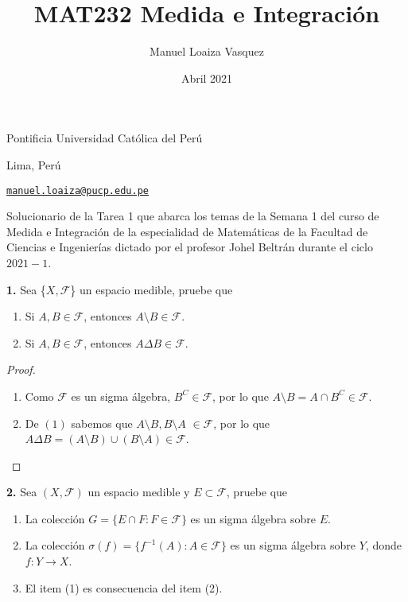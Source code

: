 \documentclass{article}
\title{MAT232 Medida e Integraci\'on}
\author{Manuel Loaiza Vasquez}
\date{Abril 2021}
\newenvironment{statement}[1]{\smallskip\noindent\color[rgb]{1.00,0.00,0.50} {\bf #1.}}{}
\theoremstyle{definition}
\theoremstyle{remark}
\begin{document}
\maketitle

\vspace*{-0.25in}
\centerline{Pontificia Universidad Cat\'olica del Per\'u}
\centerline{Lima, Per\'u}
\centerline{\href{mailto:manuel.loaiza@pucp.edu.pe}{{\tt manuel.loaiza@pucp.edu.pe}}}
\vspace*{0.15in}

\begin{framed}
  Solucionario de la Tarea 1 que abarca los temas de la Semana 1 del curso de Medida e Integraci\'on
  de la especialidad de Matem\'aticas de la Facultad de Ciencias e Ingenier\'ias
  dictado por el profesor Johel Beltr\'an durante el ciclo $2021-1$.
\end{framed}

\begin{statement}{1}
  Sea \{$X, \mathcal{F}$\} un espacio medible, pruebe que
  \begin{enumerate}
    \item Si $A, B \in \mathcal{F}$, entonces $A \setminus B \in \mathcal{F}$.
    \item Si $A, B \in \mathcal{F}$, entonces $A \Delta B \in \mathcal{F}$.
  \end{enumerate}
\end{statement}

\begin{proof}
  \begin{enumerate}
    \item Como $\mathcal{F}$ es un sigma \'algebra, $B^C \in \mathcal{F}$, por lo que $A \setminus B = A \cap B^C \in \mathcal{F}$.
    \item De $(1)$ sabemos que $A \setminus B, B \setminus A$ $\in \mathcal{F}$, por lo que $A \Delta B = (A \setminus B) \cup (B \setminus A) \in \mathcal{F}$. 
  \end{enumerate}
\end{proof}

\begin{statement}{2}
  Sea $(X, \mathcal{F})$ un espacio medible y $E \subset \mathcal{F}$, pruebe que
  \begin{enumerate}
    \item La colecci\'on $G = \{E \cap F : F \in \mathcal{F}\}$ es un sigma \'algebra sobre $E$.
    \item La colecci\'on $\sigma(f) = \{f^{-1}(A) : A \in \mathcal{F}\}$ es un sigma \'algebra sobre $Y$, donde $f: Y \to X$.
    \item El item (1) es consecuencia del item (2).
  \end{enumerate}
\end{statement}
\end{document}
